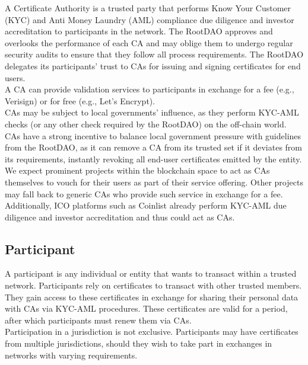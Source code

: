 \documentclass[10pt]{article}
\begin{document}
A Certificate Authority is a trusted party that performs Know Your Customer (KYC) and Anti Money Laundry (AML) compliance due diligence and investor accreditation to participants in the network. The RootDAO approves and overlooks the performance of each CA and may oblige them to undergo regular security audits to ensure that they follow all process requirements. The RootDAO delegates its participants’ trust to CAs for issuing and signing certificates for end users.  \\

\noindent A CA can provide validation services to participants in exchange for a fee (e.g., Verisign\cite{verisign}) or for free (e.g., Let’s Encrypt\cite{letsencrypt}). \\

\noindent CAs may be subject to local governments’ influence, as they perform KYC-AML checks (or any other check required by the RootDAO) on the off-chain world. CAs have a strong incentive to balance local government pressure with guidelines from the RootDAO, as it can remove a CA from its trusted set if it deviates from its requirements, instantly revoking all end-user certificates emitted by the entity. \\

\noindent We expect prominent projects within the blockchain space to act as CAs themselves to vouch for their users as part of their service offering. Other projects may fall back to generic CAs who provide such service in exchange for a fee. Additionally, ICO platforms such as Coinlist already perform KYC-AML due diligence and investor accreditation and thus could act as CAs.

\subsection{Participant}

A participant is any individual or entity that wants to transact within a trusted network. Participants rely on certificates to transact with other trusted members. They gain access to these certificates in exchange for sharing their personal data with CAs via KYC-AML procedures. These certificates are valid for a period, after which participants must renew them via CAs. \\

\noindent Participation in a jurisdiction is not exclusive. Participants may have certificates from multiple jurisdictions, should they wish to take part in exchanges in networks with varying requirements. \\
\end{document}
